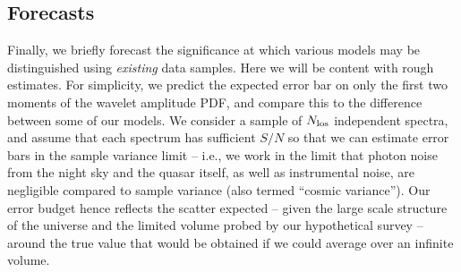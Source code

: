 \subsection{Forecasts}

Finally, we briefly forecast the significance at which various models may be distinguished using {\it existing} data samples. Here
we will be content with rough estimates. For simplicity, we predict the expected error bar on
only the first two moments of the wavelet amplitude PDF, and compare this to the difference between some of our models. 
We consider a sample of $N_{\rm los}$ independent spectra, and assume that each spectrum has sufficient $S/N$ so that
we can estimate error bars in the sample variance limit -- i.e., we work in the limit that photon noise from the night
sky and the quasar itself, as well as instrumental noise, are negligible compared to sample variance (also termed ``cosmic variance''). Our error budget hence reflects the scatter expected -- given the large scale structure of the universe and the limited
volume probed by our hypothetical survey -- around the true value that would be obtained if we could average over an infinite
volume.

